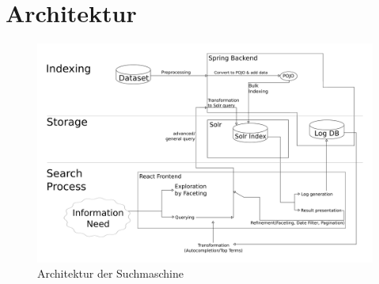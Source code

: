 \documentclass[oneside, a4paper, 12pt, titlepage]{article}
\begin{document}
\section{Architektur}
\begin{figure}[!ht]
\caption{Architektur der Suchmaschine} \label{dia2}
\includegraphics[scale=0.45]{dia2_svg.png}
\end{figure}
\end{document}
